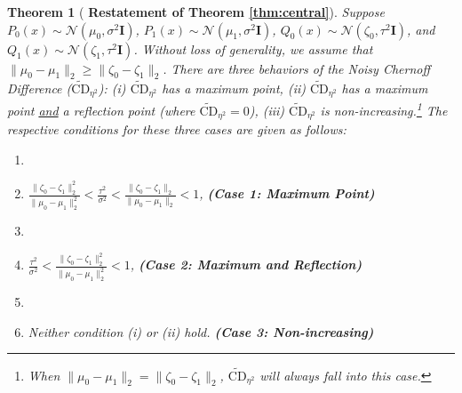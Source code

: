 \documentclass[11pt,letterpaper]{article}
\newtheorem{theorem}{Theorem}
\begin{document}
\begin{theorem}[ \textbf{Restatement of Theorem \ref{thm:central}}]
    Suppose $P_0(x)\sim\mathcal{N}(\mu_0,\sigma^2\mathbf{I})$, $P_1(x)\sim\mathcal{N}(\mu_1,\sigma^2\mathbf{I})$, $Q_0(x)\sim\mathcal{N}(\zeta_0,\tau^2\mathbf{I})$, and $Q_1(x)\sim\mathcal{N}(\zeta_1,\tau^2\mathbf{I})$. Without loss of generality, we assume that $\|\mu_0 - \mu_1\|_2 \geq \|\zeta_0 - \zeta_1\|_2$. There are three behaviors of the Noisy Chernoff Difference ($\widetilde{\text{CD}}_{\eta^2}$): (i) $\widetilde{\text{CD}}_{\eta^2}$ has a maximum point, (ii) $\widetilde{\text{CD}}_{\eta^2}$ has a maximum point \underline{and} a reflection point (where $\widetilde{\text{CD}}_{\eta^2} = 0$), (iii) $\widetilde{\text{CD}}_{\eta^2}$ is non-increasing.\footnote{When $\|\mu_0 - \mu_1\|_2 = \|\zeta_0 - \zeta_1\|_2$, $\widetilde{\text{CD}}_{\eta^2}$ will always fall into this case.} The respective conditions for these three cases are given as follows:
    \begin{enumerate}
    \item[]
        \item[(i)] $\frac{\|\zeta_0 - \zeta_1\|^2_2}{\|\mu_0 - \mu_1\|^2_2} <\frac{\tau^2}{\sigma^2} < \frac{\|\zeta_0 - \zeta_1\|_2}{\|\mu_0 - \mu_1\|_2} < 1$,  \hfill \textbf{(Case 1: Maximum Point)}

    \item[]     
        \item [(ii)] $\frac{\tau^2}{\sigma^2} < \frac{\|\zeta_0 - \zeta_1\|^2_2}{\|\mu_0 - \mu_1\|^2_2} < 1$, \hfill \textbf{(Case 2: Maximum and Reflection)}
        
    \item[]  
        \item [(iii)] Neither condition (i) or (ii) hold. \hfill \textbf{(Case 3: Non-increasing)}
    \end{enumerate}    %
\end{theorem}
\end{document}

